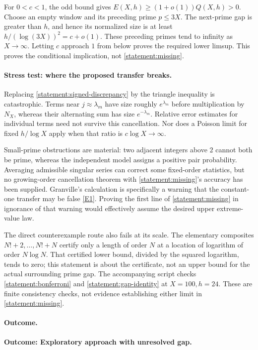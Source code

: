 \documentclass[11pt,a4paper]{article}
\newcommand{\eref}[2]{\hyperlink{extra:#1:#2}{[E#2]}}
\numberwithin{equation}{section}
\begin{document}
For $0<c<1$, the odd bound gives
$E(X,h)\ge(1+o(1))Q(X,h)>0$. Choose an empty window and its preceding
prime $p\le3X$. The next-prime gap is greater than $h$, and hence its
normalized size is at least
$h/(\log(3X))^2=c+o(1)$. These preceding primes tend to infinity as
$X\to\infty$. Letting $c$ approach $1$ from below proves the required
lower limsup. This proves the conditional implication, not
\eqref{statement:missing}.

\paragraph{Stress test: where the proposed transfer breaks.}
Replacing \eqref{statement:signed-discrepancy} by the triangle inequality is
catastrophic. Terms near $j\approx\lambda_m$ have size roughly
$e^{\lambda_m}$ before multiplication by $N_X$, whereas their alternating
sum has size $e^{-\lambda_m}$. Relative error estimates for individual
terms need not survive this cancellation. Nor does a Poisson limit for
fixed $h/\log X$ apply when that ratio is $c\log X\to\infty$.

Small-prime obstructions are material: two adjacent integers above $2$
cannot both be prime, whereas the independent model assigns a positive
pair probability. Averaging admissible singular series can correct some
fixed-order statistics, but no growing-order cancellation theorem with
\eqref{statement:missing}'s accuracy has been supplied. Granville's calculation
is specifically a warning that the constant-one transfer may be false
\eref{statement}{1}. Proving the first line of \eqref{statement:missing} in ignorance
of that warning would effectively assume the desired upper extreme-value
law.

The direct counterexample route also fails at its scale. The elementary
composites $N!+2,\ldots,N!+N$ certify only a length of order $N$ at a
location of logarithm of order $N\log N$. That certified lower bound,
divided by the squared logarithm, tends to zero; this statement is about
the certificate, not an upper bound for the actual surrounding prime gap.
The accompanying script checks \eqref{statement:bonferroni} and
\eqref{statement:gap-identity} at $X=100,h=24$. These are finite consistency
checks, not evidence establishing either limit in \eqref{statement:missing}.

\paragraph{Outcome.}
\textbf{Outcome: Exploratory approach with unresolved gap.}
\end{document}
